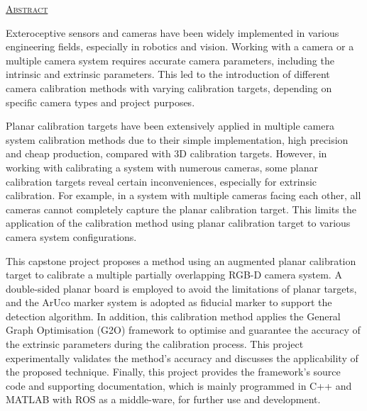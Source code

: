 \thispagestyle{fancy}
\null\vskip10mm
\begin{center}
\underline{\textsc{Abstract}}
\vskip2mm
\end{center}
\renewcommand{\baselinestretch}{1.0}
\small\normalsize
Exteroceptive sensors and cameras have been widely implemented in various engineering fields, especially in robotics and vision. Working with a camera or a multiple camera system requires accurate camera parameters, including the intrinsic and extrinsic parameters. This led to the introduction of different camera calibration methods with varying calibration targets, depending on specific camera types and project purposes.

Planar calibration targets have been extensively applied in multiple camera system calibration methods due to their simple implementation, high precision and cheap production, compared with 3D calibration targets. However, in working with calibrating a system with numerous cameras, some planar calibration targets reveal certain inconveniences, especially for extrinsic calibration. For example, in a system with multiple cameras facing each other, all cameras cannot completely capture the planar calibration target. This limits the application of the calibration method using planar calibration target to various camera system configurations.

This capstone project proposes a method using an augmented planar calibration target to calibrate a multiple partially overlapping RGB-D camera system. A double-sided planar board is employed to avoid the limitations of planar targets, and the ArUco marker system is adopted as fiducial marker to support the detection algorithm. In addition, this calibration method applies the General Graph Optimisation (G2O) framework to optimise and guarantee the accuracy of the extrinsic parameters during the calibration process. This project experimentally validates the method's accuracy and discusses the applicability of the proposed technique. Finally, this project provides the framework's source code and supporting documentation, which is mainly programmed in C++ and MATLAB with ROS as a middle-ware, for further use and development.
